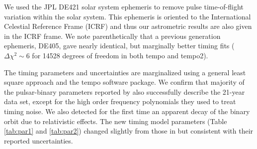 We used the JPL DE421 solar system ephemeris \citep{fwb09} to remove pulse
time-of-flight variation within the solar system. This ephemeris is oriented
to the International Celestial Reference Frame (ICRF) and thus our astrometric
results are also given in the ICRF frame. We note parenthetically that a
previous generation ephemeris, DE405, gave nearly identical, but marginally
better timing fits ($\Delta\chi^2\sim6$ for 14528 degrees of freedom in both
{\sc tempo} and {\sc tempo2}).

The timing parameters and uncertainties are marginalized using a general least
square approach and the {\sc tempo} software package. 
We confirm that majority of the pulsar-binary parameters reported by
\citet{sns+05} also successfully describe the 21-year data set, except for the
high order frequency polynomials they used to treat timing noise. We also
detected for the first time an apparent decay of the binary orbit due to
relativistic effects.
The new timing model parameters (Table \ref{tab:par1} and \ref{tab:par2}) changed slightly from
those in \citet{sns+05} but consistent with their reported uncertainties.




